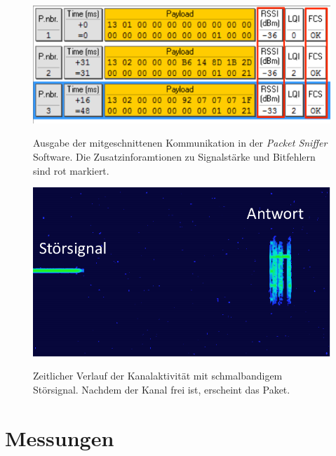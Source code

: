 \begin{figure}[bth]
        \myfloatalign
        {\includegraphics[width=0.8\linewidth]{gfx/ScS_Sniffer_AP_2Boxen_Vers_001_markiert}} 
        \caption[Sniffer]{Ausgabe der mitgeschnittenen Kommunikation in der \emph{Packet Sniffer} Software. Die Zusatzinforamtionen zu Signalstärke und Bitfehlern sind rot markiert.}\label{fig:sniffer}
\end{figure}

\begin{figure}[bth]
        \myfloatalign
        {\includegraphics[width=0.6\linewidth]{gfx/Stoerer_Spac}} 
        \caption[Störsender]{Zeitlicher Verlauf der Kanalaktivität mit schmalbandigem Störsignal. Nachdem der Kanal frei ist, erscheint das Paket.}\label{fig:spac_stoerer}
\end{figure}

\section{Messungen}

